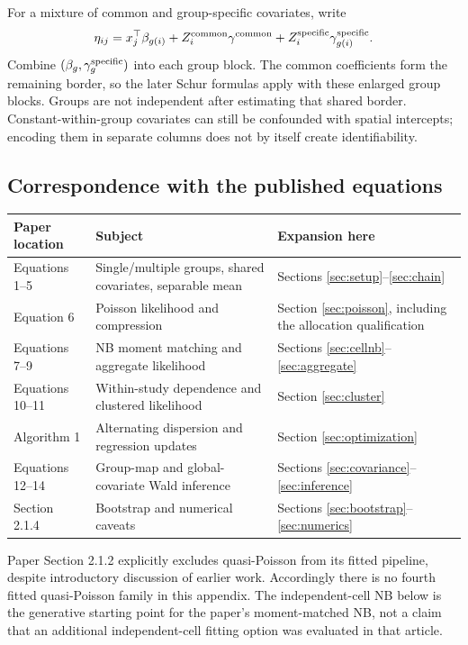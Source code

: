 \documentclass[11pt,a4paper]{article}
\numberwithin{equation}{section}
\begin{document}
For a mixture of common and group-specific covariates, write
\[
 \eta_{ij}=x_j^\top\beta_{g(i)}
            +Z_i^{\rm common}\gamma^{\rm common}
            +Z_i^{\rm specific}\gamma_{g(i)}^{\rm specific}.
\]
Combine $(\beta_g,\gamma_g^{\rm specific})$ into each group block.
The common coefficients form the remaining border, so the later
Schur formulas apply with these enlarged group blocks.
Groups are not independent after estimating that shared border.
Constant-within-group covariates can still be confounded with
spatial intercepts; encoding them in separate columns does not
by itself create identifiability.

\subsection{Correspondence with the published equations}
\begin{center}
\begin{tabularx}{\textwidth}{l T T}
\toprule
Paper location & Subject & Expansion here\\
\midrule
Equations 1--5 & Single/multiple groups, shared covariates,
separable mean & Sections \ref{sec:setup}--\ref{sec:chain}\\
Equation 6 & Poisson likelihood and compression &
Section \ref{sec:poisson}, including the allocation qualification\\
Equations 7--9 & NB moment matching and aggregate likelihood &
Sections \ref{sec:cellnb}--\ref{sec:aggregate}\\
Equations 10--11 & Within-study dependence and clustered likelihood &
Section \ref{sec:cluster}\\
Algorithm 1 & Alternating dispersion and regression updates &
Section \ref{sec:optimization}\\
Equations 12--14 & Group-map and global-covariate Wald inference &
Sections \ref{sec:covariance}--\ref{sec:inference}\\
Section 2.1.4 & Bootstrap and numerical caveats &
Sections \ref{sec:bootstrap}--\ref{sec:numerics}\\
\bottomrule
\end{tabularx}
\end{center}
Paper Section 2.1.2 explicitly excludes quasi-Poisson from its fitted
pipeline, despite introductory discussion of earlier work. Accordingly
there is no fourth fitted quasi-Poisson family in this appendix.
The independent-cell NB below is the generative starting point for
the paper's moment-matched NB, not a claim that an additional
independent-cell fitting option was evaluated in that article.
\end{document}
